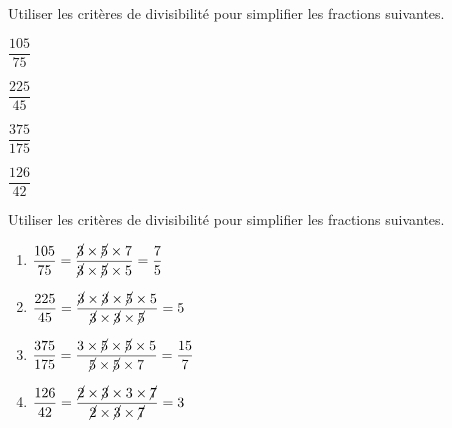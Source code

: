 \begin{exercice*}
    Utiliser les critères de divisibilité pour simplifier les fractions suivantes.
    \begin{enumerate}
        \begin{spacing}{2}
        \item $\dfrac{105}{75}$
        \item $\dfrac{225}{45}$
        \item $\dfrac{375}{175}$
        \item $\dfrac{126}{42}$
        \end{spacing}
    \end{enumerate}
    

\end{exercice*}
\begin{corrige}
    Utiliser les critères de divisibilité pour simplifier les fractions suivantes.
    
    \begin{enumerate}
        \item $\dfrac{105}{75}=\dfrac{\cancel{3}\times\cancel{5}\times7}{\cancel{3}\times\cancel{5}\times5}=\dfrac{7}{5}$
        \item $\dfrac{225}{45}=\dfrac{\cancel{3}\times\cancel{3}\times\cancel{5}\times5}{\cancel{3}\times\cancel{3}\times\cancel{5}}=5$
        \item $\dfrac{375}{175}=\dfrac{3\times\cancel{5}\times\cancel{5}\times5}{\cancel{5}\times\cancel{5}\times7}=\dfrac{15}{7}$
        \item $\dfrac{126}{42}=\dfrac{\cancel{2}\times\cancel{3}\times3\times\cancel{7}}{\cancel{2}\times\cancel{3}\times\cancel{7}}=3$
    \end{enumerate}
\end{corrige}

